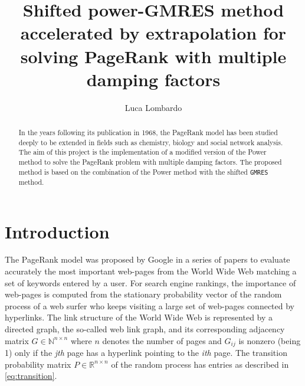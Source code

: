 \documentclass[12pt]{article}
\title{Shifted power-GMRES method accelerated by extrapolation
for solving PageRank with multiple damping factors}
\author{Luca Lombardo}
\date{}
\newcommand{\R}{\mathbb{R}}
\newcommand{\N}{\mathbb{N}}
\begin{document}
\maketitle

\begin{abstract}
    \noindent In the years following its publication in 1968, the PageRank model has been studied deeply to be extended in fields such as chemistry, biology and social network analysis. The aim of this project is the implementation of a modified version of the Power method to solve the PageRank problem with multiple damping factors. The proposed method is based on the combination of the Power method with the shifted \texttt{GMRES} method.

\end{abstract}
\tableofcontents
\clearpage

\section{Introduction}

The PageRank model was proposed by Google in a series of papers to evaluate accurately the most important web-pages from the World Wide Web matching a set of keywords entered by a user. For search engine rankings, the importance of web-pages is computed from the stationary probability vector of the random process of a web surfer who keeps visiting a large set of web-pages connected by hyperlinks. The link structure of the World Wide Web is represented by a directed graph, the so-called web link graph, and its corresponding adjacency matrix $G \in \N^{n \times n}$ where $n$ denotes the number of pages and $G_{ij}$ is nonzero (being 1) only if the \emph{jth} page has a hyperlink pointing to the \emph{ith} page. The transition probability matrix $P \in \R^{n \times n}$ of the random process has entries as described in \ref{eq:transition}.
\end{document}
